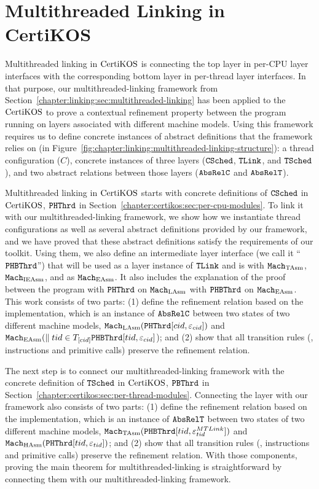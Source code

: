 \section{Multithreaded Linking in CertiKOS}
\label{chapter:certikos:sec:multithreaded-linking-for-certikos}


Multithreaded linking in $\mathrm{CertiKOS}$ is connecting the top layer in  per-CPU layer interfaces with
the corresponding bottom layer in  per-thread layer interfaces. 
In that purpose, our multithreaded-linking framework from Section~\ref{chapter:linking:sec:multithreaded-linking} 
has been applied to the $\mathrm{CertiKOS}$ to prove a contextual refinement property between the program running on  layers associated with different machine models.
Using this framework requires us to define concrete instances 
of  abstract definitions that the framework relies on (in Figure~\ref{fig:chapter:linking:multithreaded-linking-structure}):
a thread configuration ($C$), concrete instances of three layers (${{\mathrm{\texttt{CSched}}}}$, ${{\mathrm{\texttt{TLink}}}}$, and ${{\mathrm{\texttt{TSched}}}}$), 
and  two abstract relations between those layers (${{\mathrm{\texttt{AbsRelC}}}}$ and ${{\mathrm{\texttt{AbsRelT}}}}$). 

Multithreaded linking in $\mathrm{CertiKOS}$  starts with concrete definitions of ${{\mathrm{\texttt{CSched}}}}$ in $\mathrm{CertiKOS}$, ${{\mathrm{\texttt{PHThrd}}}}$ in Section~\ref{chapter:certikos:sec:per-cpu-modules}.
To link it with our multithreaded-linking framework,
we show how we instantiate thread configurations as well as several abstract definitions provided by our framework, and we have proved that these abstract definitions satisfy the requirements of our toolkit.
Using them, we also define an intermediate layer interface (we call it ``${{\mathrm{\texttt{PHBThrd}}}}$'') that will be used as a layer instance of ${{\mathrm{\texttt{TLink}}}}$ and is with ${\mathrm{\texttt{Mach}}}_{\mathrm{TAsm}}$, ${\mathrm{\texttt{Mach}}}_{\mathrm{IEAsm}}$, and as ${\mathrm{\texttt{Mach}}}_{\mathrm{EAsm}}$.
It also includes  the explanation of the proof between the program with  ${{\mathrm{\texttt{PHThrd}}}}$ on ${\mathrm{\texttt{Mach}}}_{\mathrm{LAsm}}$ 
with ${{\mathrm{\texttt{PHBThrd}}}}$ on ${\mathrm{\texttt{Mach}}}_{\mathrm{EAsm}}$. 
This work consists of two parts:  (1) define the refinement relation based on the implementation, which is an instance of ${{\mathrm{\texttt{AbsRelC}}}}$ between two states of two different machine models,
${\mathrm{\texttt{Mach}}}_{\mathrm{LAsm}}({{\mathrm{\texttt{PHThrd}}}}[cid, {\varepsilon}_{cid}])$ and 
${\mathrm{\texttt{Mach}}}_{\mathrm{EAsm}}(\parallel tid \in T_{[cid]} {{\mathrm{\texttt{PHBThrd}}}}[tid, {\varepsilon}_{cid}]$); and 
(2) show that all transition rules (\ie, instructions and primitive calls) preserve the refinement relation. 

The next step is to connect our multithreaded-linking framework with the concrete definition of  ${{\mathrm{\texttt{TSched}}}}$ in $\mathrm{CertiKOS}$, ${{\mathrm{\texttt{PBThrd}}}}$ in Section~\ref{chapter:certikos:sec:per-thread-modules}.
Connecting the layer with our framework also consists of two parts:  (1) define the refinement relation based on the implementation, which is an instance of ${{\mathrm{\texttt{AbsRelT}}}}$ between two states of two different machine models,
${\mathrm{\texttt{Mach}}}_{\mathrm{TAsm}}({{\mathrm{\texttt{PHBThrd}}}}[tid, {\varepsilon}^{MTLink}_{tid}])$ and 
${\mathrm{\texttt{Mach}}}_{\mathrm{HAsm}}({{\mathrm{\texttt{PHThrd}}}}[tid, {\varepsilon}_{tid}])$; and 
(2) show that all transition rules (\ie, instructions and primitive calls) preserve the refinement relation. 
With those components, proving the main theorem for multithreaded-linking is straightforward by connecting 
them with our multithreaded-linking framework.



